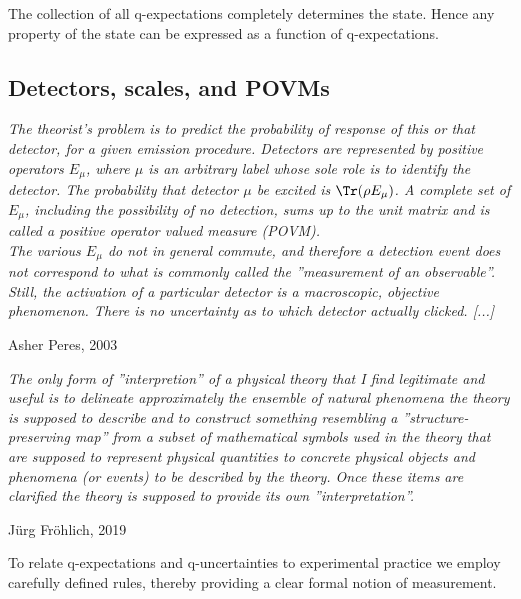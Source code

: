 \documentclass[12pt]{article}
\begin{document}
The collection of all q-expectations completely determines the state.
Hence any property of the state can be expressed as a function of
q-expectations.



\subsection{Detectors, scales, and POVMs}\label{ss.detectors}

\nopagebreak
\hfill\parbox[t]{10.8cm}{\footnotesize

{\em
The theorist's problem is to predict the probability of response of this
or that detector, for a given emission procedure. Detectors are
represented by positive operators $E_\mu$, where $\mu$ is an arbitrary
label whose sole role is to identify the detector. The probability that
detector $\mu$ be excited is $\Tr(\rho E_\mu)$. A complete set of
$E_\mu$, including the possibility of no detection, sums up to the unit
matrix and is called a positive operator valued measure (POVM).
\\
The various $E_\mu$ do not in general commute, and therefore a
detection event does not correspond to what is commonly called the
''measurement of an observable''. Still, the activation of a particular
detector is a macroscopic, objective phenomenon. There is no
uncertainty as to which detector actually clicked. [...]}

\hfill Asher Peres, 2003 \cite[p.1545]{Per2003}
}

\bigskip

\nopagebreak
\hfill\parbox[t]{10.8cm}{\footnotesize

{\em
The only form of ''interpretion'' of a physical theory that I find
legitimate and useful is to delineate approximately the ensemble of
 natural phenomena the theory is supposed to describe and to construct
something resembling a ''structure-preserving map'' from a subset of
mathematical symbols used in the theory that are supposed to represent
physical quantities to concrete physical objects and phenomena
(or events) to be described by the theory. Once these items are
clarified the theory is supposed to provide its own ''interpretation''.
}

\hfill J\"urg Fr\"ohlich, 2019 \cite[p.3]{Fro2019r}
}

\bigskip

To relate q-expectations and q-uncertainties to experimental practice
we employ carefully defined rules, thereby providing a clear formal
notion of measurement.
\end{document}
